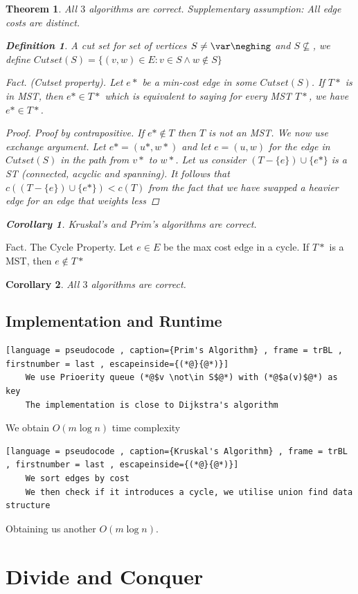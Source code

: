 \documentclass[a4paper]{article}
\theoremstyle{plain}
\newtheorem{thm}{Theorem}[section]
\newtheorem*{cor}{Corollary}
\theoremstyle{definition}
\newtheorem{defn}{Definition}[section]
\theoremstyle{remark}
\begin{document}
	\begin{thm}
		All $3$ algorithms are correct. Supplementary assumption: All edge costs are distinct. 
		\begin{defn}
			A cut set for set of vertices $S\neq \var\neghing$ and $S \not\subseteq$, we define $Cutset(S) = \{(v,w) \in E : v \in S \land w \not\in S\}$ \\
		\end{defn}
		Fact. (Cutset property). Let $e*$ be a min-cost edge in some $Cutset(S)$. If $T*$ is in MST, then $e* \in T*$ which is equivalent to saying for every MST $T*$, we have $e* \in T*$. 
		 \begin{proof}
			Proof by contrapositive. If $e* \not\in T$ then $T$ is not an MST. We now use exchange argument. Let $e* = (u*,w*)$ and let $e = (u,w)$ for the edge in $Cutset(S)$ in the path from $v*$ to $w*$. Let us consider $(T - \{e\}) \cup \{e*\}$ is a ST (connected, acyclic and spanning). It follows that $c((T - \{e\}) \cup \{e*\}) < c(T)$ from the fact that we have swapped a heavier edge for an edge that weights less
		\end{proof}
		\begin{cor}
			Kruskal's and Prim's algorithms are correct.
		\end{cor}
	\end{thm}
	Fact. The Cycle Property. Let $e \in E$ be the max cost edge in a cycle. If $T*$ is a MST, then $e \not\in T*$
	\begin{cor}
		All $3$ algorithms are correct.
	\end{cor}
	\subsection{Implementation and Runtime}
	\begin{lstlisting}[language = pseudocode , caption={Prim's Algorithm} , frame = trBL , firstnumber = last , escapeinside={(*@}{@*)}]
	We use Prioerity queue (*@$v \not\in S$@*) with (*@$a(v)$@*) as key
	The implementation is close to Dijkstra's algorithm
	\end{lstlisting}	
	We obtain $O(m \log n)$ time complexity
	\begin{lstlisting}[language = pseudocode , caption={Kruskal's Algorithm} , frame = trBL , firstnumber = last , escapeinside={(*@}{@*)}]
	We sort edges by cost
	We then check if it introduces a cycle, we utilise union find data structure
	\end{lstlisting}
	Obtaining us another $O(m \log n)$.
	\section{Divide and Conquer}
\end{document}
